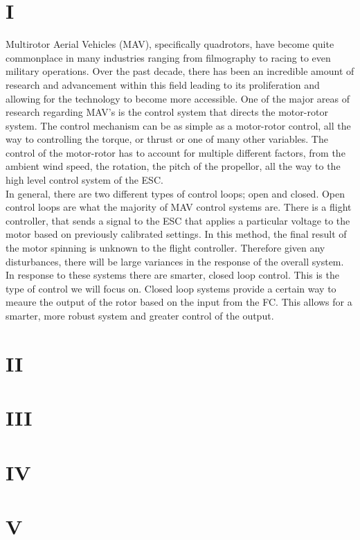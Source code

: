 \documentclass{article}
\begin{document}
\section{I}

Multirotor Aerial Vehicles (MAV), specifically quadrotors, have become quite commonplace in many industries ranging from filmography to racing to even military operations. Over the past decade, there has been an incredible amount of research and advancement within this field leading to its proliferation and allowing for the technology to become more accessible. One of the major areas of research regarding MAV's is the control system that directs the motor-rotor system. The control mechanism can be as simple as a motor-rotor control, all the way to controlling the torque, or thrust or one of many other variables. The control of the motor-rotor has to account for multiple different factors, from the ambient wind speed, the rotation, the pitch of the propellor, all the way to the high level control system of the ESC. \\

In general, there are two different types of control loops; open and closed. Open control loops are what the majority of MAV control systems are. There is a flight controller, that sends a signal to the ESC that applies a particular voltage to the motor based on previously calibrated settings. In this method, the final result of the motor spinning is unknown to the flight controller. Therefore given any disturbances, there will be large variances in the response of the overall system. In response to these systems there are smarter, closed loop control. This is the type of control we will focus on. Closed loop systems provide a certain way to meaure the output of the rotor based on the input from the FC. This allows for a smarter, more robust system and greater control of the output. 





\section{II}



\section{III}


\section{IV}



\section{V}

\end{document}
